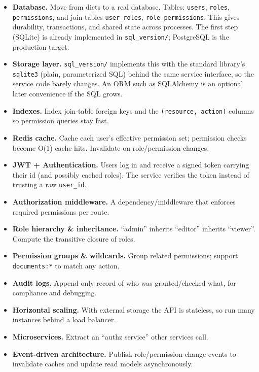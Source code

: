 \documentclass[11pt,a4paper]{report}
\begin{document}
\begin{itemize}[leftmargin=1.4em]
  \item \textbf{Database.} Move from dicts to a real database. Tables:
        \texttt{users}, \texttt{roles}, \texttt{permissions}, and join tables
        \texttt{user\_roles}, \texttt{role\_permissions}. This gives durability,
        transactions, and shared state across processes. The first step (SQLite)
        is already implemented in \texttt{sql\_version/}; PostgreSQL is the
        production target.
  \item \textbf{Storage layer.} \texttt{sql\_version/} implements this with the
        standard library's \texttt{sqlite3} (plain, parameterized SQL) behind the
        same service interface, so the service code barely changes. An ORM such
        as SQLAlchemy is an optional later convenience if the SQL grows.
  \item \textbf{Indexes.} Index join-table foreign keys and the
        \texttt{(resource, action)} columns so permission queries stay fast.
  \item \textbf{Redis cache.} Cache each user's effective permission set;
        permission checks become O(1) cache hits. Invalidate on role/permission
        changes.
  \item \textbf{JWT + Authentication.} Users log in and receive a signed token
        carrying their id (and possibly cached roles). The service verifies the
        token instead of trusting a raw \texttt{user\_id}.
  \item \textbf{Authorization middleware.} A dependency/middleware that enforces
        required permissions per route.
  \item \textbf{Role hierarchy \& inheritance.} ``admin'' inherits ``editor''
        inherits ``viewer''. Compute the transitive closure of roles.
  \item \textbf{Permission groups \& wildcards.} Group related permissions;
        support \texttt{documents:*} to match any action.
  \item \textbf{Audit logs.} Append-only record of who was granted/checked what,
        for compliance and debugging.
  \item \textbf{Horizontal scaling.} With external storage the API is stateless,
        so run many instances behind a load balancer.
  \item \textbf{Microservices.} Extract an ``authz service'' other services call.
  \item \textbf{Event-driven architecture.} Publish role/permission-change events
        to invalidate caches and update read models asynchronously.
\end{itemize}
\end{document}
